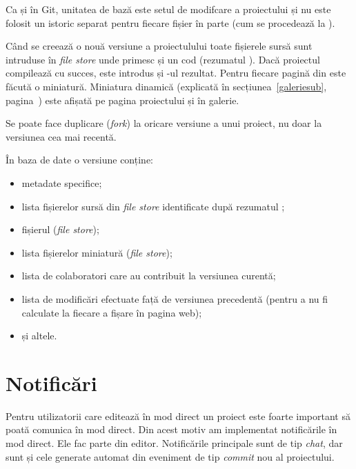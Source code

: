\documentclass[a4wide,12pt]{report}
\newcommand{\eng}[1]{\emph{#1}} %
\newcommand{\acr}[1]{{\textsmaller[1]{\textsc{#1}}}} %
\begin{document}
Ca și în Git, unitatea de bază este setul de modifcare a proiectului și nu este
folosit un istoric separat pentru fiecare fișier în parte (cum se procedează la
\acr{SVN}).

Când se creează o nouă versiune a proiectulului toate fișierele sursă sunt
intruduse în \eng{file store} unde primesc și un cod (rezumatul \acr{SHA1}).
Dacă proiectul compilează cu succes, este introdus și \acr{PDF}-ul rezultat.
Pentru fiecare pagină din \acr{PDF} este făcută o miniatură. Miniatura dinamică
(explicată în secțiunea~\ref{galeriesub}, pagina~\pageref{galeriesub}) este
afișată pe pagina proiectului și în galerie.

Se poate face duplicare (\eng{fork}) la oricare versiune a unui proiect, nu doar
la versiunea cea mai recentă.

În baza de date o versiune conține:

\begin{itemize}

\item metadate specifice;

\item lista fișierelor sursă din \eng{file store} identificate după rezumatul
\acr{SHA1};

\item fișierul \acr{PDF} (\eng{file store});

\item lista fișierelor miniatură (\eng{file store});

\item lista de colaboratori care au contribuit la versiunea curentă;

\item lista de modificări efectuate față de versiunea precedentă (pentru a nu fi
calculate la fiecare a fișare în pagina web);

\item și altele.

\end{itemize}

\section{Notificări}
\label{notificarisec}

Pentru utilizatorii care editează în mod direct un proiect este foarte important
să poată comunica în mod direct. Din acest motiv am implementat notificările în
mod direct. Ele fac parte din editor. Notificările principale sunt de tip
\eng{chat}, dar sunt și cele generate automat din eveniment de tip \eng{commit}
nou al proiectului.
\end{document}
